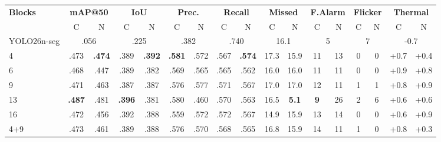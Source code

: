 \begin{table}[ht]
\begin{center}
\footnotesize
\setlength{\tabcolsep}{4pt}
\begin{tabular}{l cc cc cc cc cc cc cc cc}
\toprule
\multirow{2}{*}{\textbf{Blocks}}
  & \multicolumn{2}{c}{\textbf{mAP@50}}
  & \multicolumn{2}{c}{\textbf{IoU}}
  & \multicolumn{2}{c}{\textbf{Prec.}}
  & \multicolumn{2}{c}{\textbf{Recall}}
  & \multicolumn{2}{c}{\textbf{Missed}}
  & \multicolumn{2}{c}{\textbf{F.Alarm}}
  & \multicolumn{2}{c}{\textbf{Flicker}}
  & \multicolumn{2}{c}{\textbf{Thermal}} \\
\cmidrule(lr){2-3}\cmidrule(lr){4-5}\cmidrule(lr){6-7}\cmidrule(lr){8-9}
\cmidrule(lr){10-11}\cmidrule(lr){12-13}\cmidrule(lr){14-15}\cmidrule(lr){16-17}
  & C & N & C & N & C & N & C & N & C & N & C & N & C & N & C & N \\
\midrule
YOLO26n-seg & \multicolumn{2}{c}{.056} & \multicolumn{2}{c}{.225} & \multicolumn{2}{c}{.382} & \multicolumn{2}{c}{.740} & \multicolumn{2}{c}{16.1} & \multicolumn{2}{c}{5} & \multicolumn{2}{c}{7} & \multicolumn{2}{c}{-0.7} \\
\midrule
4           & .473 & \textbf{.474} & .389 & \textbf{.392} & \textbf{.581} & .572          & .567          & \textbf{.574} & 17.3          & 15.9          & 11          & 13          & 0 & 0 & +0.7 & +0.4 \\
6           & .468 & .447          & .389 & .382          & .569          & .565          & .565          & .562          & 16.0          & 16.0          & 11          & 11          & 0 & 0 & +0.9 & +0.8 \\
9           & .471 & .463          & .387 & .387          & .576          & .577          & .571          & .567          & 17.0          & 17.0          & 12          & 11          & 1 & 1 & +0.8 & +0.9 \\
\midrule
13          & \textbf{.487} & .481 & \textbf{.396} & .381 & .580          & .460          & .570          & .563          & 16.5          & \textbf{5.1}  & \textbf{9}  & 26          & 2 & 6 & +0.6 & +0.6 \\
16          & .472 & .456          & .392 & .388          & .559          & .572          & .572          & .567          & 14.9          & 15.9          & 13          & 14          & 0 & 0 & +0.6 & +0.9 \\
4+9         & .473 & .461          & .389 & .388          & .576          & .570          & .568          & .565          & 16.8          & 15.9          & 14          & 11          & 1 & 0 & +0.8 & +0.3 \\

\end{tabular}
\end{center}
\end{table}
